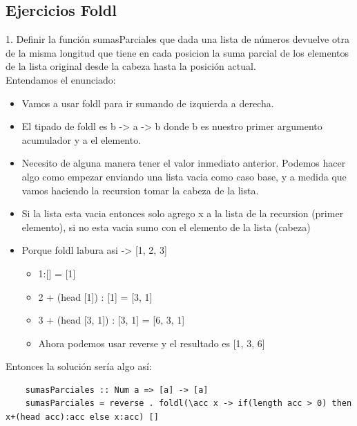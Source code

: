 \documentclass[10pt,a4paper]{article}
\begin{document}
\subsection*{Ejercicios Foldl}
\label{subsec:foldl_ejercicios}
1. Definir la función sumasParciales que dada una lista de números devuelve otra de la misma longitud que tiene en cada posicion la suma parcial de los elementos de la lista original desde la cabeza hasta la posición actual. \\
Entendamos el enunciado: 
\begin{itemize}
    \item Vamos a usar foldl para ir sumando de izquierda a derecha.
    \item El tipado de foldl es b -> a -> b donde b es nuestro primer argumento acumulador y a el elemento.
    \item Necesito de alguna manera tener el valor inmediato anterior. Podemos hacer algo como empezar enviando una lista vacia como caso base, y a medida que vamos haciendo la recursion tomar la cabeza de la lista.
    \item Si la lista esta vacia entonces solo agrego x a la lista de la recursion (primer elemento), si no esta vacia sumo con el elemento de la lista (cabeza) 
    \item Porque foldl labura asi -> [1, 2, 3]
    \begin{itemize}
        \item 1:[] = [1]
        \item 2 + (head [1]) : [1] = [3, 1]
        \item 3 + (head [3, 1]) : [3, 1] = [6, 3, 1]
        \item Ahora podemos usar reverse y el resultado es [1, 3, 6]
    \end{itemize}
\end{itemize}
Entonces la solución sería algo así: 
\begin{lstlisting}
    sumasParciales :: Num a => [a] -> [a]
    sumasParciales = reverse . foldl(\acc x -> if(length acc > 0) then x+(head acc):acc else x:acc) []
\end{lstlisting}
\end{document}
